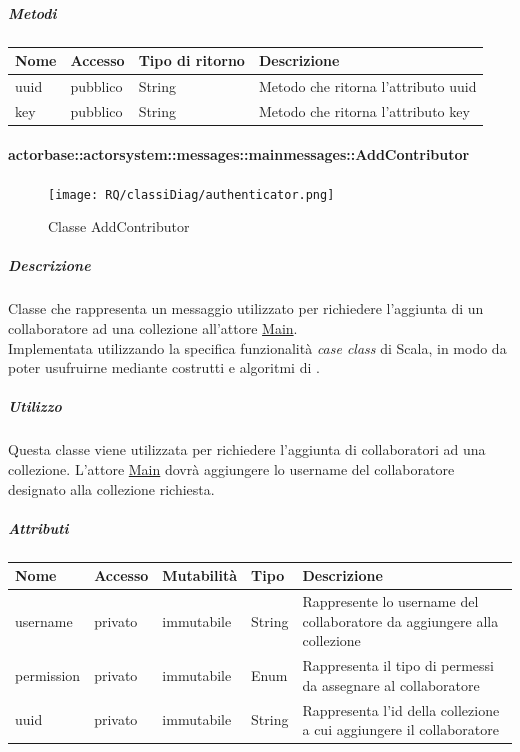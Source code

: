 \documentclass{scalatekids-article}
\begin{document}
\subparagraph{Metodi}
\begin{tabular}{| l | l | l | l |}
  \hline
  Nome & Accesso & Tipo di ritorno & Descrizione\\
  \hline
  uuid & pubblico & String & Metodo che ritorna l'attributo uuid\\
  \hline
  key & pubblico & String & Metodo che ritorna l'attributo key\\
  \hline
\end{tabular}

\paragraph{actorbase::actorsystem::messages::mainmessages::AddContributor}
\label{sec:actorbase::actorsystem::messages::mainmessages::AddContributor}

\begin{figure}[H]
  \begin{center}
    \texttt{[image: RQ/classiDiag/authenticator.png]}
    \caption{Classe AddContributor}
  \end{center}
\end{figure}

\subparagraph{Descrizione}
Classe che rappresenta un messaggio utilizzato per richiedere l'aggiunta di un
collaboratore ad una collezione all'attore \hyperref[sec:actorbase::actorsystem::actors::main::Main]{Main}.\\Implementata
utilizzando la specifica funzionalità \textit{case class} di Scala, in modo da poter usufruirne mediante costrutti e algoritmi di
.

\subparagraph{Utilizzo}
Questa classe viene utilizzata per richiedere l'aggiunta di collaboratori ad
una collezione. L'attore
\hyperref[sec:actorbase::actorsystem::actors::main::Main]{Main} dovrà aggiungere
lo username del collaboratore designato alla collezione richiesta.

\subparagraph{Attributi}
\begin{tabular}{| p{2cm} | p{1.5cm} | p{2cm} | p{3cm} | p{8.5cm} |}
  \hline
  Nome & Accesso & Mutabilità & Tipo & Descrizione\\
  \hline
  username & privato & immutabile & String & Rappresente lo username del collaboratore da aggiungere alla collezione\\
  \hline
  permission & privato & immutabile & Enum & Rappresenta il tipo di permessi da assegnare al collaboratore\\
  \hline
  uuid & privato & immutabile & String & Rappresenta l'id della collezione a cui aggiungere il collaboratore\\
  \hline
\end{tabular}
\end{document}
